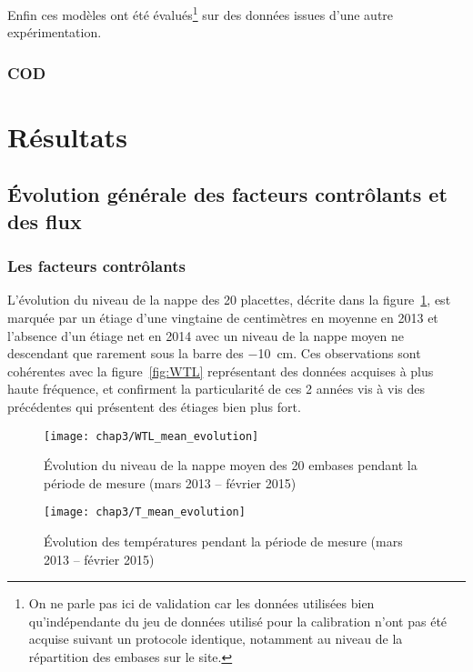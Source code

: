 Enfin ces modèles ont été évalués\footnote{On ne parle pas ici de validation car les données utilisées bien qu'indépendante du jeu de données utilisé pour la calibration n'ont pas été acquise suivant un protocole identique, notamment au niveau de la répartition des embases sur le site.} sur des données issues d'une autre expérimentation.

\subsubsection{COD}

\section{Résultats}

\subsection{Évolution générale des facteurs contrôlants et des flux}

\subsubsection{Les facteurs contrôlants}

L'évolution du niveau de la nappe des 20 placettes, décrite dans la figure~\ref{fig:WTL_mean_evolution}, est marquée par un étiage d'une vingtaine de centimètres en moyenne en 2013 et l'absence d'un étiage net en 2014 avec un niveau de la nappe moyen ne descendant que rarement sous la barre des \SI{-10}{\cm}.
Ces observations sont cohérentes avec la figure~\ref{fig:WTL} représentant des données acquises à plus haute fréquence, et confirment la particularité de ces 2 années vis à vis des précédentes qui présentent des étiages bien plus fort.

\begin{figure}
\centering
\texttt{[image: chap3/WTL\_mean\_evolution]}
\caption{Évolution du niveau de la nappe moyen des 20 embases pendant la période de mesure (mars 2013 -- février 2015)}
\label{fig:WTL_mean_evolution}
\end{figure}


\begin{figure}
\centering
\texttt{[image: chap3/T\_mean\_evolution]}
\caption{Évolution des températures pendant la période de mesure (mars 2013 -- février 2015)}
\label{fig:T_mean_evolution}
\end{figure}


